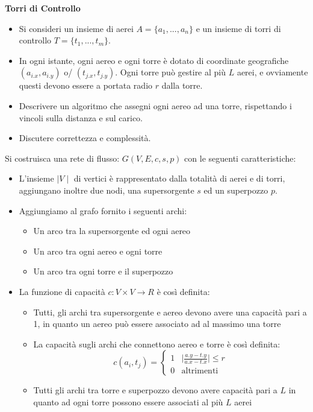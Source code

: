 \documentclass[../cheatSheetAlgoritmi.tex]{subfiles}
\begin{document}
\textbf{Torri di Controllo}
\begin{itemize}
    \item Si consideri un insieme di aerei $A=\{a_1,..., a_n\}$ e un insieme di torri di controllo $T=\{t_1,..., t_m\}$.
    \item In ogni istante, ogni aereo e ogni torre è dotato di coordinate geografiche $(a_{i.x}, a_{i.y})$ o/ $(t_{j.x}, t_{j.y})$. Ogni torre può gestire al più $L$ aerei, e ovviamente questi devono essere a portata radio $r$ dalla torre. 
    \item Descrivere un algoritmo che assegni ogni aereo ad una torre, rispettando i vincoli sulla distanza e sul carico. 
    \item Discutere correttezza e complessità.
\end{itemize}
Si costruisca una rete di flusso: $G(V, E, c, s, p)$ con le seguenti caratteristiche:
\begin{itemize}
    \item L'insieme $\mid V \mid$ di vertici è rappresentato dalla totalità di aerei e di torri, aggiungano inoltre due nodi, una supersorgente $s$ ed un superpozzo $p$.
    \item Aggiungiamo al grafo fornito i seguenti archi:
    \begin{itemize}
        \item Un arco tra la supersorgente ed ogni aereo
        \item Un arco tra ogni aereo e ogni torre
        \item Un arco tra ogni torre e il superpozzo
    \end{itemize}
    \item La funzione di capacità $c: V \times V \rightarrow R$ è così definita:
    \begin{itemize}
        \item Tutti, gli archi tra supersorgente e aereo devono avere una capacità pari a 1, in quanto un aereo può essere associato ad al massimo una torre
        \item La capacità sugli archi che connettono aereo e torre è così definita:
            \begin{equation*}
                c(a_{i}, t_{j})=\begin{cases}
                    1 & \text{$\mid \frac{a.y - t.y}{a.x - t.x} \mid \leq r$} \\
                    0 & \text{altrimenti}
                \end{cases}
            \end{equation*}
        \item Tutti gli archi tra torre e superpozzo devono avere capacità pari a $L$ in quanto ad ogni torre possono essere associati al più $L$ aerei
    \end{itemize}
\end{itemize}
\end{document}
